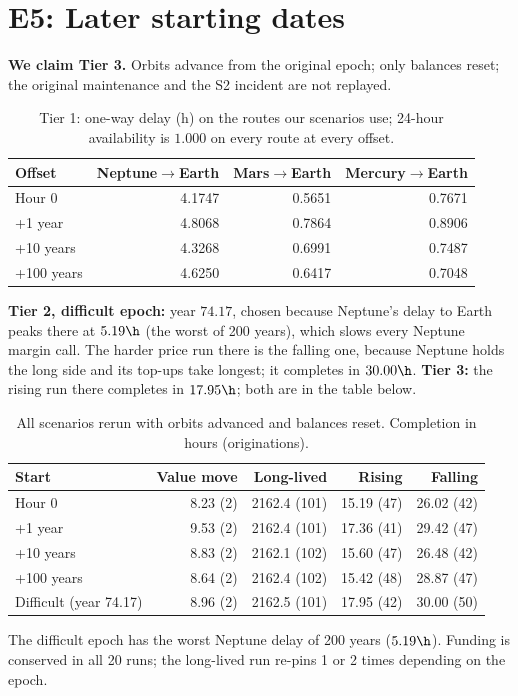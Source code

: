 \section{E5: Later starting dates}\label{app:e5}
\textbf{We claim Tier 3.} Orbits advance from the original epoch; only balances reset; the original maintenance and the S2 incident are not replayed.
\begin{table}[H]
\centering
\caption{Tier 1: one-way delay (h) on the routes our scenarios use; 24-hour availability is $1.000$ on every route at every offset.}
\small
\begin{tabular}{@{}lrrr@{}}
\toprule
Offset & Neptune$\to$Earth & Mars$\to$Earth & Mercury$\to$Earth \\
\midrule
Hour 0 & 4.1747 & 0.5651 & 0.7671 \\
+1 year & 4.8068 & 0.7864 & 0.8906 \\
+10 years & 4.3268 & 0.6991 & 0.7487 \\
+100 years & 4.6250 & 0.6417 & 0.7048 \\
\bottomrule
\end{tabular}
\end{table}
\textbf{Tier 2, difficult epoch:} year $74.17$, chosen because Neptune's delay to Earth peaks there at $5.19\h$ (the worst of 200 years), which slows every Neptune margin call. The harder price run there is the falling one, because Neptune holds the long side and its top-ups take longest; it completes in $30.00\h$. \textbf{Tier 3:} the rising run there completes in $17.95\h$; both are in the table below.
\begin{table}[H]
\centering
\caption{All scenarios rerun with orbits advanced and balances reset. Completion in hours (originations).}
\small
\begin{tabular}{@{}lrrrr@{}}
\toprule
Start & Value move & Long-lived & Rising & Falling \\
\midrule
Hour 0 & 8.23 (2) & 2162.4 (101) & 15.19 (47) & 26.02 (42) \\
+1 year & 9.53 (2) & 2162.4 (101) & 17.36 (41) & 29.42 (47) \\
+10 years & 8.83 (2) & 2162.1 (102) & 15.60 (47) & 26.48 (42) \\
+100 years & 8.64 (2) & 2162.4 (102) & 15.42 (48) & 28.87 (47) \\
Difficult (year 74.17) & 8.96 (2) & 2162.5 (101) & 17.95 (42) & 30.00 (50) \\
\bottomrule
\end{tabular}
\end{table}
The difficult epoch has the worst Neptune delay of 200 years ($5.19\h$). Funding is conserved in all 20 runs; the long-lived run re-pins 1 or 2 times depending on the epoch.

